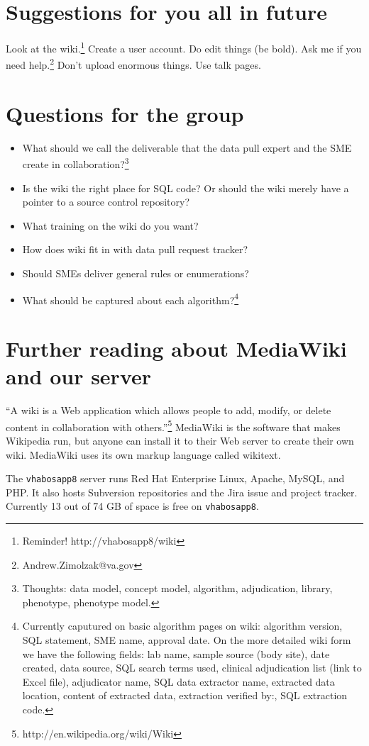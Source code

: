 \documentclass{tufte-handout}
\begin{document}
\section{Suggestions for you all in future}

Look at the wiki.\footnote{Reminder! http://vhabosapp8/wiki} Create a
user account. Do edit things (be bold). Ask me if you need
help.\footnote{Andrew.Zimolzak@va.gov} Don't upload enormous things.
Use talk pages.

\section{Questions for the group}

\begin{itemize}

\item What should we call the deliverable that the data pull expert
  and the SME create in collaboration?\footnote{Thoughts: data
    model, concept model, algorithm, adjudication, library, phenotype,
    phenotype model.}

\item Is the wiki the right place for SQL code? Or should the wiki
  merely have a pointer to a source control repository?

\item What training on the wiki do you want?

\item How does wiki fit in with data pull request tracker?

\item Should SMEs deliver general rules or enumerations?

\item What should be captured about each algorithm?\footnote{Currently
  caputured on basic algorithm pages on wiki: algorithm version, SQL
  statement, SME name, approval date. On the more detailed wiki form
  we have the following fields: lab name, sample source (body site),
  date created, data source, SQL search terms used, clinical
  adjudication list (link to Excel file), adjudicator name, SQL data
  extractor name, extracted data location, content of extracted data,
  extraction verified by:, SQL extraction code.}

\end{itemize}

\section{Further reading about MediaWiki and our server}

``A wiki is a Web application which allows people to add, modify, or
delete content in collaboration with
others.''\footnote{http://en.wikipedia.org/wiki/Wiki} MediaWiki is the
software that makes Wikipedia run, but anyone can install it to their
Web server to create their own wiki. MediaWiki uses its own markup
language called wikitext.

The \texttt{vhabosapp8} server runs Red Hat Enterprise Linux, Apache,
MySQL, and PHP. It also hosts Subversion repositories and the Jira
issue and project tracker. Currently 13 out of 74 GB of space is free
on \texttt{vhabosapp8}.
\end{document}
